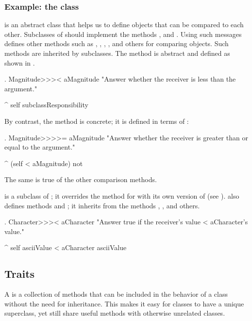\documentclass[a4paper,10pt,twoside]{book}
\begin{document}
\subsubsection{Example: the class }
 is an abstract class that helps us to  define objects that can be compared to each other.
Subclasses of  should implement the methods \ct{<}, \ct{=} and .
Using such messages  defines other methods such as \ct{>}, \ct{>=}, \ct{<=}, ,   and others for comparing objects.
Such methods are inherited by subclasses.
The method  is abstract and defined as shown in .

\begin{method}[MagnitudeLessThan]{.}
Magnitude>>>< aMagnitude
	"Answer whether the receiver is less than the argument."

	^ self subclassResponsibility
\end{method}

\noindent
By contrast, the method  is concrete; it is defined in terms of \ct{<}:

\begin{method}[Magnitude>=]{.}
Magnitude>>>>= aMagnitude
	"Answer whether the receiver is greater than or equal to the argument."

	^ (self < aMagnitude) not
\end{method}
The same is true of the other comparison methods.

 is a subclass of ; it overrides the  method for \ct{<} with its own version of \ct{<} (see ).
 also defines methods \ct{=} and ; it inherits from  the methods \ct{>=}, \ct{<=}, \ct{~=} and others.

\begin{method}[CharacterLessThan]{.}
Character>>>< aCharacter
	"Answer true if the receiver's value < aCharacter's value."

	^ self asciiValue < aCharacter asciiValue
\end{method}

\subsection{Traits}
A  is a collection of methods that can be included in the behavior of a class without the need for inheritance.
This makes it easy for classes to have a unique superclass, yet still share useful methods with otherwise unrelated classes.
\end{document}
